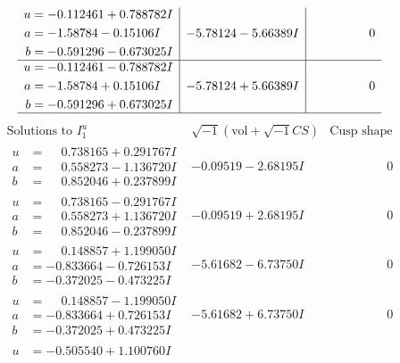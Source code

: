 \documentclass[1p]{elsarticle_modified}
\theoremstyle{definition}
\newcommand{\I}{\sqrt{-1}}
\begin{document}
$$\begin{array}{c|c|c}
\begin{aligned}
u &= -0.112461 + 0.788782 I \\
a &= -1.58784 - 0.15106 I \\
b &= -0.591296 - 0.673025 I\end{aligned}
 & -5.78124 - 5.66389 I & \phantom{-0.000000 } 0 \\ \hline\begin{aligned}
u &= -0.112461 - 0.788782 I \\
a &= -1.58784 + 0.15106 I \\
b &= -0.591296 + 0.673025 I\end{aligned}
 & -5.78124 + 5.66389 I & \phantom{-0.000000 } 0\\
 \hline 
 \end{array}$$\newpage$$\begin{array}{c|c|c}  
\text{Solutions to }I^u_{1}& \I (\text{vol} + \sqrt{-1}CS) & \text{Cusp shape}\\
 \hline 
\begin{aligned}
u &= \phantom{-}0.738165 + 0.291767 I \\
a &= \phantom{-}0.558273 - 1.136720 I \\
b &= \phantom{-}0.852046 + 0.237899 I\end{aligned}
 & -0.09519 - 2.68195 I & \phantom{-0.000000 } 0 \\ \hline\begin{aligned}
u &= \phantom{-}0.738165 - 0.291767 I \\
a &= \phantom{-}0.558273 + 1.136720 I \\
b &= \phantom{-}0.852046 - 0.237899 I\end{aligned}
 & -0.09519 + 2.68195 I & \phantom{-0.000000 } 0 \\ \hline\begin{aligned}
u &= \phantom{-}0.148857 + 1.199050 I \\
a &= -0.833664 - 0.726153 I \\
b &= -0.372025 - 0.473225 I\end{aligned}
 & -5.61682 - 6.73750 I & \phantom{-0.000000 } 0 \\ \hline\begin{aligned}
u &= \phantom{-}0.148857 - 1.199050 I \\
a &= -0.833664 + 0.726153 I \\
b &= -0.372025 + 0.473225 I\end{aligned}
 & -5.61682 + 6.73750 I & \phantom{-0.000000 } 0 \\ \hline\begin{aligned}
u &= -0.505540 + 1.100760 I \\

\end{aligned}
\end{array}$$
\end{document}
